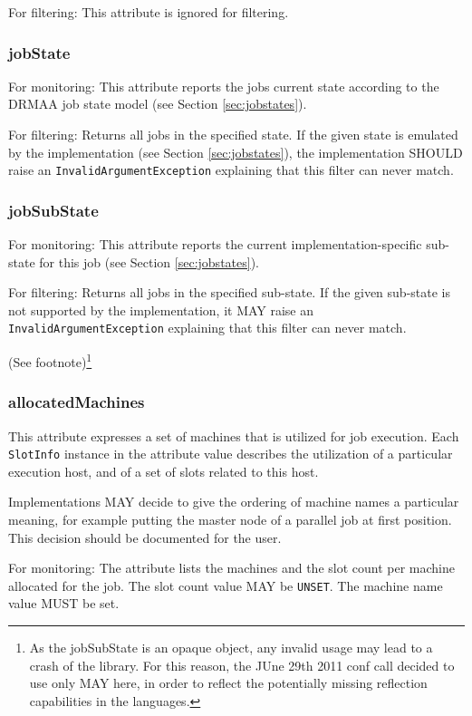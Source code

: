 \documentclass{article}
\newcommand{\h}[1]{\lstinline|#1|}
\newcommand{\rat}[1]{ {\tiny(See footnote)}\footnote{#1} }
\begin{document}
For filtering: This attribute is ignored for filtering.

\subsubsection{jobState}

For monitoring: This attribute reports the jobs current state according to the DRMAA job state model (see Section \ref{sec:jobstates}).

For filtering: Returns all jobs in the specified state. If the given state is emulated by the implementation (see Section \ref{sec:jobstates}), the implementation SHOULD raise an \h{InvalidArgumentException} explaining that this filter can never match.

\subsubsection{jobSubState}
\label{sec:jobSubState}

For monitoring: This attribute reports the current implementation-specific sub-state for this job (see Section \ref{sec:jobstates}).

For filtering: Returns all jobs in the specified sub-state. If the given sub-state is not supported by the implementation, it MAY raise an \h{InvalidArgumentException} explaining that this filter can never match.

\rat{As the jobSubState is an opaque object, any invalid usage may lead to a crash of the library. For this reason, the JUne 29th 2011 conf call decided to use only MAY here, in order to reflect the potentially missing reflection capabilities in the languages.}

\subsubsection{allocatedMachines}

This attribute expresses a set of machines that is utilized for job execution. Each \h{SlotInfo} instance in the attribute value describes the utilization of a particular execution host, and of a set of slots related to this host.

Implementations MAY decide to give the ordering of machine names a particular meaning, for example putting the master node of a parallel job at first position. This decision should be documented for the user. 

For monitoring: The attribute lists the machines and the slot count per machine allocated for the job. The slot count value MAY be \h{UNSET}. The machine name value MUST be set.
\end{document}
